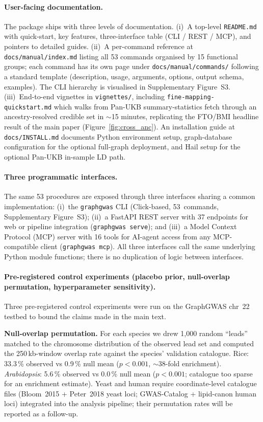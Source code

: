 \paragraph{User-facing documentation.}
The package ships with three levels of documentation. (i)~A
top-level \texttt{README.md} with quick-start, key features,
three-interface table (CLI / REST / MCP), and pointers to detailed
guides. (ii)~A per-command reference at \texttt{docs/manual/index.md}
listing all 53 commands organised by 15 functional groups; each
command has its own page under \texttt{docs/manual/commands/}
following a standard template (description, usage, arguments,
options, output schema, examples). The CLI hierarchy is visualised
in Supplementary Figure~S3. (iii)~End-to-end vignettes in
\texttt{vignettes/}, including \texttt{fine-mapping-quickstart.md}
which walks from Pan-UKB summary-statistics fetch through an
ancestry-resolved credible set in $\sim$15 minutes, replicating
the FTO/BMI headline result of the main paper (Figure~\ref{fig:cross_anc}). An
installation guide at \texttt{docs/INSTALL.md} documents Python
environment setup, graph-database configuration for the optional full-graph
deployment, and Hail setup for the optional Pan-UKB in-sample LD
path.

\paragraph{Three programmatic interfaces.}
The same 53 procedures are exposed through three interfaces sharing
a common implementation: (i)~the \texttt{graphgwas} CLI (Click-based,
53~commands, Supplementary Figure~S3); (ii)~a FastAPI REST server
with 37 endpoints for web or pipeline integration
(\texttt{graphgwas serve}); and (iii)~a Model Context Protocol (MCP)
server with 16 tools for AI-agent access from any MCP-compatible
client (\texttt{graphgwas mcp}). All three interfaces call the
same underlying Python module functions; there is no duplication of
logic between interfaces.

\paragraph{Pre-registered control experiments (placebo prior, null-overlap permutation, hyperparameter sensitivity).}\label{snote:controls}%
Three pre-registered control experiments were run on the GraphGWAS
chr~22 testbed to bound the claims made in the main text.

\textbf{Null-overlap permutation.} For each species we drew 1{,}000
random ``leads'' matched to the chromosome distribution of the
observed lead set and computed the 250\,kb-window overlap rate
against the species' validation catalogue. Rice: 33.3\,\% observed
vs 0.9\,\% null mean ($p < 0.001$, $\sim$38-fold enrichment).
\emph{Arabidopsis}: 5.6\,\% observed vs 0.0\,\% null mean
($p < 0.001$; catalogue too sparse for an enrichment estimate).
Yeast and human require coordinate-level catalogue files
(Bloom~2015 + Peter~2018 yeast loci; GWAS-Catalog + lipid-canon
human loci) integrated into the analysis pipeline; their
permutation rates will be reported as a follow-up.

